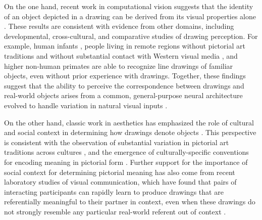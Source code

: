 \documentclass[9pt,twocolumn,twoside]{pnas-new}
\begin{document}

On the one hand, recent work in computational vision suggests that the identity of an object depicted in a drawing can be derived from its visual properties alone \cite{FanCommon2018}.
These results are consistent with evidence from other domains, including developmental, cross-cultural, and comparative studies of drawing perception. 
For example, human infants \cite{hochberg1962pictorial}, people living in remote regions without pictorial art traditions and without substantial contact with Western visual media \cite{kennedy1975outline}, and higher non-human primates \cite{tanaka2007recognition} are able to recognize line drawings of familiar objects, even without prior experience with drawings.
Together, these findings suggest that the ability to perceive the correspondence between drawings and real-world objects arises from a common, general-purpose neural architecture evolved to handle variation in natural visual inputs \cite{Sayim:2011bz,gibson2014ecological}. 



On the other hand, classic work in aesthetics has emphasized the role of cultural and social context in determining how drawings denote objects \cite{goodman1976languages}.
This perspective is consistent with the observation of substantial variation in pictorial art traditions across cultures \cite{gombrich1989stor,gombrich1969art}, and the emergence of culturally-specific conventions for encoding meaning in pictorial form \cite{boltz1994origin,allen2000middle}. 
Further support for the importance of social context for determining pictorial meaning has also come from recent laboratory studies of visual communication, which have found that pairs of interacting participants can rapidly learn to produce drawings that are referentially meaningful to their partner in context, even when these drawings do not strongly resemble any particular real-world referent out of context \cite{Garrod:2007wk,fay2010interactive,Galantucci:2005uh}. 
\end{document}
